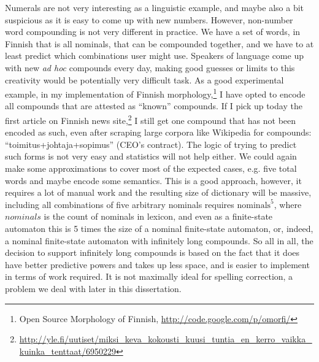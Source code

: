 \documentclass[officiallayout,final]{unihelcompling}
\begin{document}
Numerals are not very interesting as a linguistic example, and maybe also a bit
suspicious as it is easy to come up with new numbers. However, non-number word
compounding is not very different in practice. We have a set of words, in
Finnish that is all nominals, that can be compounded together, and we have to
at least predict which combinations user might use. Speakers of language come
up with new \emph{ad hoc} compounds every day, making good guesses or limits to
this creativity would be potentially very difficult task. As a good
experimental example, in my implementation of Finnish morphology,\footnote{Open
Source Morphology of Finnish, \url{http://code.google.com/p/omorfi/}} I have
opted to encode all compounds that are attested as ``known'' compounds. If I
pick up today the first article on Finnish news
site,\footnote{\url{http://yle.fi/uutiset/miksi_keva_kokousti_kuusi_tuntia_en_kerro_vaikka_kuinka_tenttaat/6950229}}
I still get one compound that has not been encoded as such, even after scraping
large corpora like Wikipedia for compounds: ``toimitus+johtaja+sopimus'' (CEO's
contract). The logic of trying to predict such forms is not very easy and
statistics will not help either. We could again make some approximations to
cover most of the expected cases, e.g. five total words and maybe encode some
semantics. This is a good approach, however, it requires a lot of manual work
and the resulting size of dictionary will be massive, including all
combinations of five arbitrary nominals requires $\mathrm{nominals}^5$, where
$nominals$ is the count of nominals in lexicon, and even as a finite-state
automaton this is 5 times the size of a nominal finite-state automaton,
or, indeed, a nominal finite-state automaton with infinitely long
compounds. So all in all, the decision to support infinitely long compounds is
based on the fact that it does have better predictive powers and takes up less
space, and is easier to implement in terms of work required.  It is not
maximally ideal for spelling correction, a problem we deal with later in this
dissertation.
\end{document}
